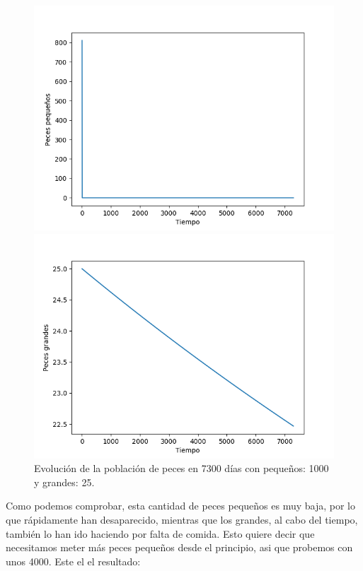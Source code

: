 \documentclass[11pt,a4paper]{report}
\begin{document}
\begin{figure}[H]
	\begin{minipage}{0.5\textwidth}
	  \centering
	  \includegraphics[scale=0.45]{img/pequenios-800-25.png}
	\end{minipage}
	\begin{minipage}{0.5\textwidth}
	  \centering
	  \includegraphics[scale=0.45]{img/grandes-800-25.png}
	\end{minipage}
	\caption{Evolución de la población de peces en 7300 días con pequeños: 1000 y grandes: 25.}
\end{figure}

Como podemos comprobar, esta cantidad de peces pequeños es muy baja, por lo que rápidamente han desaparecido, mientras que los grandes, al
cabo del tiempo, también lo han ido haciendo por falta de comida. Esto quiere decir que necesitamos meter más peces pequeños desde el principio,
asi que probemos con unos 4000. Este el el resultado:
\end{document}
